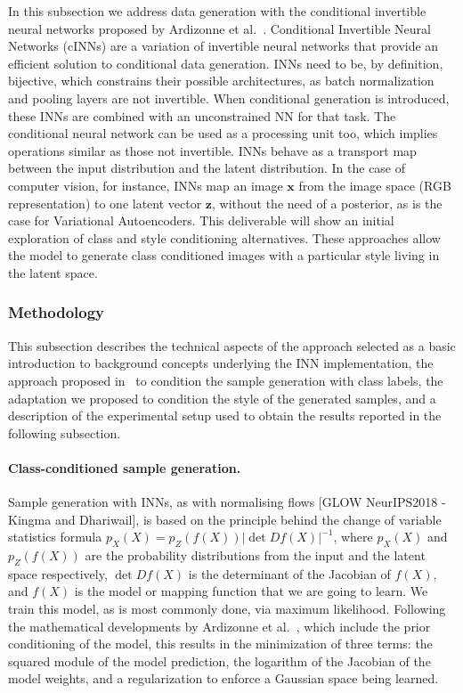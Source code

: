         In this subsection we address data generation with the conditional invertible neural networks proposed by Ardizonne et al.~\cite{2019_arxiv_cinn}. Conditional Invertible Neural Networks (cINNs) are a variation of invertible neural networks that provide an efficient solution to conditional data generation. INNs need to be, by definition, bijective, which constrains their possible architectures, as batch normalization and pooling layers are not invertible. When conditional generation is introduced, these INNs are combined with an unconstrained NN for that task. The conditional neural network can be used as a processing unit too, which implies operations similar as those not invertible. INNs behave as a transport map between the input distribution and the latent distribution. In the case of computer vision, for instance, INNs map an image $\mathbf{x}$ from the image space (RGB representation) to one latent vector $\mathbf{z}$, without the need of a posterior, as is the case for Variational Autoencoders. This deliverable will show an initial exploration of class and style conditioning alternatives. These approaches allow the model to generate class conditioned images with a particular style living in the latent space.
        
        \subsubsection{Methodology}

            This subsection describes the technical aspects of the approach selected as a basic introduction to background concepts underlying the INN implementation, the approach proposed in~\cite{2019_arxiv_cinn} to condition the sample generation with class labels, the adaptation we proposed to condition the style of the generated samples, and a description of the experimental setup used to obtain the results reported in the following subsection.
         
            \paragraph{Class-conditioned sample generation.} 
            Sample generation with INNs, as with normalising flows [GLOW NeurIPS2018 - Kingma and Dhariwail], is based on the principle behind the change of variable statistics formula $p_{X}(X) = p_{Z}(f(X))|\det Df(X)|^{-1}$, where $p_{X}(X)$ and $p_{Z}(f(X))$ are the probability distributions from the input and the latent space respectively, $\det Df(X)$ is the determinant of the Jacobian of $f(X)$, and $f(X)$ is the model or mapping function that we are going to learn. We train this model, as is most commonly done, via maximum likelihood. Following the mathematical developments by Ardizonne et al.~\cite{2019_arxiv_cinn}, which include the prior conditioning of the model, this results in the minimization of three terms: the squared module of the model prediction, the logarithm of the Jacobian of the model weights, and a regularization to enforce a Gaussian space being learned. 
                        
